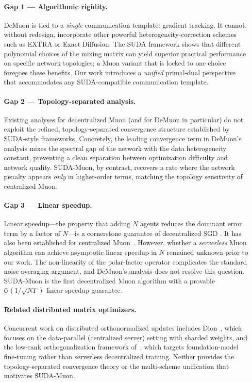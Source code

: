 \paragraph{Gap 1 — Algorithmic rigidity.}
DeMuon is tied to a \emph{single} communication template: gradient tracking.
It cannot, without redesign, incorporate other powerful heterogeneity-correction
schemes such as EXTRA or Exact Diffusion.  The SUDA framework shows that
different polynomial choices of the mixing matrix can yield superior practical
performance on specific network topologies; a Muon variant that is locked to
one choice foregoes these benefits.  Our work introduces a \emph{unified}
primal-dual perspective that accommodates any SUDA-compatible communication
template.

\paragraph{Gap 2 — Topology-separated analysis.}
Existing analyses for decentralized Muon (and for DeMuon in particular) do not
exploit the refined, topology-separated convergence structure established by
SUDA-style frameworks.  Concretely, the leading convergence term in DeMuon's
analysis mixes the spectral gap of the network with the data heterogeneity
constant, preventing a clean separation between optimization difficulty and
network quality.  SUDA-Muon, by contrast, recovers a rate where the network
penalty appears \emph{only} in higher-order terms, matching the topology
sensitivity of centralized Muon.

\paragraph{Gap 3 — Linear speedup.}
Linear speedup—the property that adding $N$ agents reduces the dominant error
term by a factor of $N$—is a cornerstone guarantee of decentralized SGD
\citep{lian2017can, koloskova2020unified}.  It has also been established for
centralized Muon~\citep{li2025note}.  However, whether a \emph{serverless}
Muon algorithm can achieve asymptotic linear speedup in $N$ remained unknown
prior to our work.  The non-linearity of the polar-factor operator complicates
the standard noise-averaging argument, and DeMuon's analysis does not resolve
this question.  SUDA-Muon is the first decentralized Muon algorithm with a
provable $\mathcal{O}(1/\sqrt{NT})$ linear-speedup guarantee.

\paragraph{Related distributed matrix optimizers.}
Concurrent work on distributed orthonormalized updates includes
Dion~\citep{ahn2025dion}, which focuses on the data-parallel (centralized
server) setting with sharded weights, and the low-rank orthogonalization
framework of~\citet{he2025lowrank}, which targets foundation-model fine-tuning
rather than serverless decentralized training.  Neither provides the
topology-separated convergence theory or the multi-scheme unification that
motivates SUDA-Muon.
